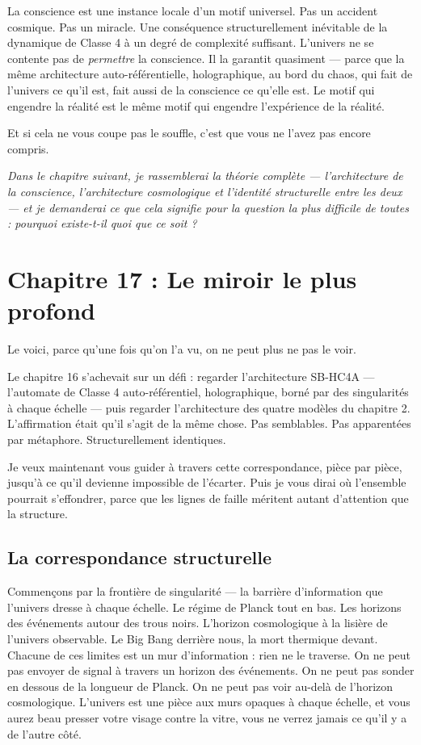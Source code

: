 \documentclass[11pt, twoside, openright]{book}
\begin{document}
La conscience est une instance locale d'un motif universel. Pas un accident cosmique. Pas un miracle. Une conséquence structurellement inévitable de la dynamique de Classe 4 à un degré de complexité suffisant. L'univers ne se contente pas de \textit{permettre} la conscience. Il la garantit quasiment --- parce que la même architecture auto-référentielle, holographique, au bord du chaos, qui fait de l'univers ce qu'il est, fait aussi de la conscience ce qu'elle est. Le motif qui engendre la réalité est le même motif qui engendre l'expérience de la réalité.

Et si cela ne vous coupe pas le souffle, c'est que vous ne l'avez pas encore compris.


\textit{Dans le chapitre suivant, je rassemblerai la théorie complète --- l'architecture de la conscience, l'architecture cosmologique et l'identité structurelle entre les deux --- et je demanderai ce que cela signifie pour la question la plus difficile de toutes : pourquoi existe-t-il quoi que ce soit ?}


\chapter*{Chapitre 17 : Le miroir le plus profond}

Le voici, parce qu'une fois qu'on l'a vu, on ne peut plus ne pas le voir.

Le chapitre 16 s'achevait sur un défi : regarder l'architecture SB-HC4A --- l'automate de Classe 4 auto-référentiel, holographique, borné par des singularités à chaque échelle --- puis regarder l'architecture des quatre modèles du chapitre 2. L'affirmation était qu'il s'agit de la même chose. Pas semblables. Pas apparentées par métaphore. Structurellement identiques.

Je veux maintenant vous guider à travers cette correspondance, pièce par pièce, jusqu'à ce qu'il devienne impossible de l'écarter. Puis je vous dirai où l'ensemble pourrait s'effondrer, parce que les lignes de faille méritent autant d'attention que la structure.

\section*{La correspondance structurelle}

Commençons par la frontière de singularité --- la barrière d'information que l'univers dresse à chaque échelle. Le régime de Planck tout en bas. Les horizons des événements autour des trous noirs. L'horizon cosmologique à la lisière de l'univers observable. Le Big Bang derrière nous, la mort thermique devant. Chacune de ces limites est un mur d'information : rien ne le traverse. On ne peut pas envoyer de signal à travers un horizon des événements. On ne peut pas sonder en dessous de la longueur de Planck. On ne peut pas voir au-delà de l'horizon cosmologique. L'univers est une pièce aux murs opaques à chaque échelle, et vous aurez beau presser votre visage contre la vitre, vous ne verrez jamais ce qu'il y a de l'autre côté.
\end{document}
